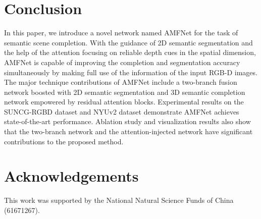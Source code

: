 \documentclass[letterpaper]{article} \usepackage{aaai20}  \usepackage{times}  \usepackage{helvet} \usepackage{courier}  \usepackage[hyphens]{url}  \usepackage{graphicx} \urlstyle{rm} \def\UrlFont{\rm}  \usepackage{graphicx}  \frenchspacing  \setlength{\pdfpagewidth}{8.5in}  \setlength{\pdfpageheight}{11in}
\begin{document}
\section{Conclusion}
In this paper, we introduce a novel network named AMFNet for the task of semantic scene completion. With the guidance of 2D semantic segmentation and the help of the attention focusing on reliable depth cues in the spatial dimension, AMFNet is capable of improving the completion and segmentation accuracy simultaneously by making full use of the information of the input RGB-D images. The major technique contributions of AMFNet include a two-branch fusion network boosted with 2D semantic segmentation and 3D semantic completion network empowered by residual attention blocks. Experimental results on the SUNCG-RGBD dataset and NYUv2 dataset demonstrate AMFNet achieves state-of-the-art performance. Ablation study and visualization results also show that the two-branch network and the attention-injected network have significant contributions to the proposed method.

\section{Acknowledgements}
This work was supported by the National Natural Science Funds of China (61671267).




\end{document}
